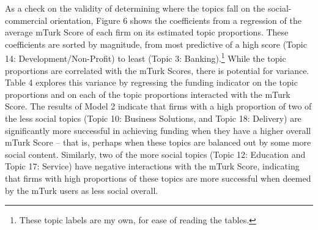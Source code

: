 \documentclass[12pt]{article}
\begin{document}
As a check on the validity of determining where the topics fall on the social-commercial orientation, Figure 6 shows the coefficients from a regression of the average mTurk Score of each firm on its estimated topic proportions. These coefficients are sorted by magnitude, from most predictive of a high score (Topic 14: Development/Non-Profit) to least (Topic 3: Banking).\footnote{These topic labels are my own, for ease of reading the tables.} While the topic proportions are correlated with the mTurk Scores, there is potential for variance. Table 4 explores this variance by regressing the funding indicator on the topic proportions and on each of the topic proportions interacted with the mTurk Score. The results of Model 2 indicate that firms with a high proportion of two of the less social topics (Topic 10: Business Solutions, and Topic 18: Delivery) are significantly more successful in achieving funding when they have a higher overall mTurk Score -- that is, perhaps when these topics are balanced out by some more social content. Similarly, two of the more social topics (Topic 12: Education and Topic 17: Service) have negative interactions with the mTurk Score, indicating that firms with high proportions of these topics are more successful when deemed by the mTurk users as less social overall.
\end{document}
